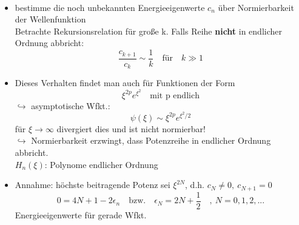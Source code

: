 \documentclass[10pt,article,colorback,accentcolor=tud9d]{scrartcl}
\begin{document}
\begin{itemize}
\begin{align}
    \end{align}
  \item bestimme die noch unbekannten Energieeigenwerte $c_n$ über Normierbarkeit der Wellenfunktion\\
    Betrachte Rekursionsrelation für große k. Falls Reihe \textbf{nicht} in endlicher Ordnung abbricht:
    \begin{equation}
    \frac{c_{k+1}}{c_k}\sim\frac{1}{k}\quad \text{für}\quad k\gg 1
    \end{equation}
  \item Dieses Verhalten findet man auch für Funktionen der Form 
    \begin{equation}
    \xi^{2p}e^{\xi^2} \quad \text{mit p endlich}
    \end{equation}
    $\hookrightarrow$ asymptotische Wfkt.:
    \begin{equation}
    \psi(\xi)\sim\xi^{2p}e^{\xi^2/2}
    \end{equation}
    für $\xi\rightarrow\infty$ divergiert dies und ist nicht normierbar!\\
    $\hookrightarrow$ Normierbarkeit erzwingt, dass Potenzreihe in endlicher Ordnung abbricht.\\
    $H_n(\xi)$: Polynome endlicher Ordnung
  \item Annahme: höchste beitragende Potenz sei $\xi^{2N}$, d.h. $c_N\neq0,\ c_{N+1}=0$
    \begin{equation}
    0=4N+1-2\epsilon_n \quad\text{bzw.}\quad \epsilon_N=2N+\frac{1}{2}\quad,\ N=0,1,2,...
    \end{equation}
    Energieeigenwerte für gerade Wfkt.
\end{itemize}
\end{document}
